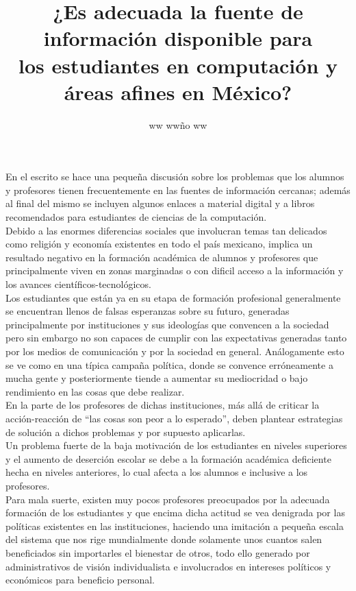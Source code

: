\documentclass{article}
\title{¿Es adecuada la fuente de información disponible para \\los estudiantes en computación y áreas afines en México?}
\author{ww ww\~no ww}
\date{} %
\begin{document}
	\maketitle
	\normalsize{
En el escrito se hace una pequeña discusión sobre los problemas que los alumnos y profesores tienen frecuentemente en las fuentes de información cercanas; además al final del mismo se incluyen algunos enlaces a material digital y a libros recomendados para estudiantes de ciencias de la computación.
\\

Debido a las enormes diferencias sociales que involucran temas tan delicados como religión y economía existentes en todo el país mexicano, implica un resultado negativo en la formación académica de alumnos y profesores que principalmente viven en zonas marginadas o con dificil acceso a la información y los avances científicos-tecnológicos.
\\

Los estudiantes que están ya en su etapa de formación profesional generalmente se encuentran llenos de falsas esperanzas sobre su futuro, generadas principalmente por instituciones y sus ideologías que convencen a la sociedad pero sin embargo no son capaces de cumplir con las expectativas generadas tanto por los medios de comunicación y por la sociedad en general. Análogamente esto se ve como en una típica campaña política, donde se convence erróneamente a mucha gente y posteriormente tiende a aumentar su mediocridad o bajo rendimiento en las cosas que debe realizar.
\\

En la parte de los profesores de dichas instituciones, más allá de criticar la acción-reacción de “las cosas son peor a lo esperado”, deben plantear estrategias de solución a dichos problemas y por supuesto aplicarlas.
\\

Un problema fuerte de la baja motivación de los estudiantes en niveles superiores y el aumento de deserción escolar se debe a la formación académica deficiente hecha en niveles anteriores, lo cual afecta a los alumnos e inclusive a los profesores.
\\

Para mala suerte, existen muy pocos profesores preocupados por la adecuada formación de los estudiantes y que encima dicha actitud se vea denigrada por las políticas existentes en las instituciones, haciendo una imitación a pequeña escala del sistema que nos rige mundialmente donde solamente unos cuantos salen beneficiados sin importarles el bienestar de otros, todo ello generado por administrativos de visión individualista e involucrados en intereses políticos y económicos para beneficio personal.
\\

}
\end{document}
